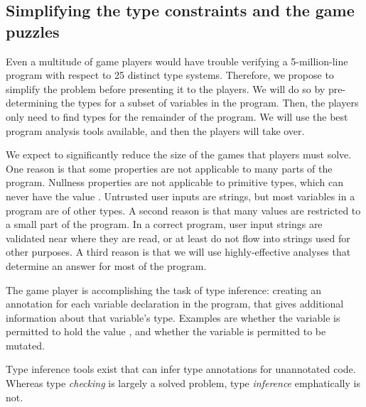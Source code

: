 \documentclass{sig-alternate}
\def\<#1>{\codeid{#1}}
\newcommand{\codeid}[1]{\ifmmode{\mbox{\ttfamily{#1}}}\else{\ttfamily #1}\fi}
\begin{document}
\subsection{Simplifying the type constraints and the game puzzles}
\label{sec:simplification}

Even a multitude of game players would have trouble verifying a
5-million-line program with respect to 25 distinct type systems.
Therefore, we propose to simplify the problem before presenting it to the
players.  We will do so by pre-determining the types for a subset of
variables in the program.  Then, the players only need to find types for
the remainder of the program.  We will use the best program analysis tools
available, and then the players will take over.

We expect to significantly reduce the size of the games that players must
solve.  One reason is that some properties are not applicable to many parts
of the program.  Nullness properties are not applicable to primitive types,
which can never have the value \<null>.  Untrusted user inputs are strings,
but most variables in a program are of other types.  A second reason is
that many values are restricted to a small part of the program.  In a
correct program, user input strings are validated near where they are read,
or at least do not flow into strings used for other purposes.  A third
reason is that we will use highly-effective analyses that determine an
answer for most of the program.

The game player is accomplishing the task of type inference:  creating an
annotation for each variable declaration in the program, that gives
additional information about that variable's type.  Examples are whether
the variable is permitted to hold the value \<null>, and whether the
variable is permitted to be mutated.

Type inference tools exist that can infer type annotations for unannotated
code.  Whereas type \emph{checking} is largely a solved problem, type
\emph{inference} emphatically is not.
\end{document}
